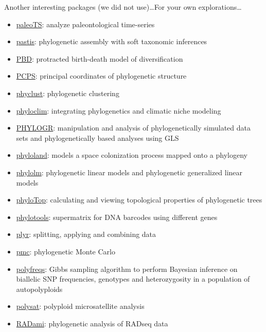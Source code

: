 \documentclass[compress, ucs, xelatex, 11pt, xcolor=svgnames,
  hyperref={
    bookmarks=true,
    unicode=true,
    colorlinks=true,
    pdftitle={Molecular data in R},
    plainpages=false,
    pdfauthor={Vojtech Zeisek},
    pdfsubject={Course about phylogeny and evolution in R},
    pdfcreator={XeLaTeX},
    pdfkeywords={R, evolution, phylogeny, molecular data},
    linkcolor=Tomato,
    anchorcolor=SaddleBrown,
    citecolor=Goldenrod,
    filecolor=DarkMagenta,
    menucolor=Sienna,
    urlcolor=DarkTurquoise,
    pdftex},
  url={hyphens, lowtilde} %
  ]{beamer}
\begin{document}
\begin{frame}[allowframebreaks]{Another interesting packages (we did not use)\ldots}{For your own explorations\ldots}
\begin{itemize}
    \item \href{https://cran.r-project.org/package=paleoTS}{paleoTS}: analyze paleontological time-series
    \item \href{https://cran.r-project.org/package=pastis}{pastis}: phylogenetic assembly with soft taxonomic inferences
    \item \href{https://cran.r-project.org/package=PBD}{PBD}: protracted birth-death model of diversification
    \item \href{https://cran.r-project.org/package=PCPS}{PCPS}: principal coordinates of phylogenetic structure
    \item \href{https://cran.r-project.org/package=phyclust}{phyclust}: phylogenetic clustering
    \item \href{https://cran.r-project.org/package=phyloclim}{phyloclim}: integrating phylogenetics and climatic niche modeling
    \item \href{https://cran.r-project.org/package=PHYLOGR}{PHYLOGR}: manipulation and analysis of phylogenetically simulated data sets and phylogenetically based analyses using GLS
    \item \href{https://cran.r-project.org/package=phyloland}{phyloland}: models a space colonization process mapped onto a phylogeny
    \item \href{https://cran.r-project.org/package=phylolm}{phylolm}: phylogenetic linear models and phylogenetic generalized linear models
    \item \href{https://cran.r-project.org/package=phyloTop}{phyloTop}: calculating and viewing topological properties of phylogenetic trees
    \item \href{https://cran.r-project.org/package=phylotools}{phylotools}: supermatrix for DNA barcodes using different genes
    \item \href{https://cran.r-project.org/package=plyr}{plyr}: splitting, applying and combining data
    \item \href{https://cran.r-project.org/package=pmc}{pmc}: phylogenetic Monte Carlo
    \item \href{https://cran.r-project.org/package=polyfreqs}{polyfreqs}: Gibbs sampling algorithm to perform Bayesian inference on biallelic SNP frequencies, genotypes and heterozygosity in a population of autopolyploids
    \item \href{https://cran.r-project.org/package=polysat}{polysat}: polyploid microsatellite analysis
    \item \href{https://cran.r-project.org/package=RADami}{RADami}: phylogenetic analysis of RADseq data

\end{itemize}
\end{frame}
\end{document}
